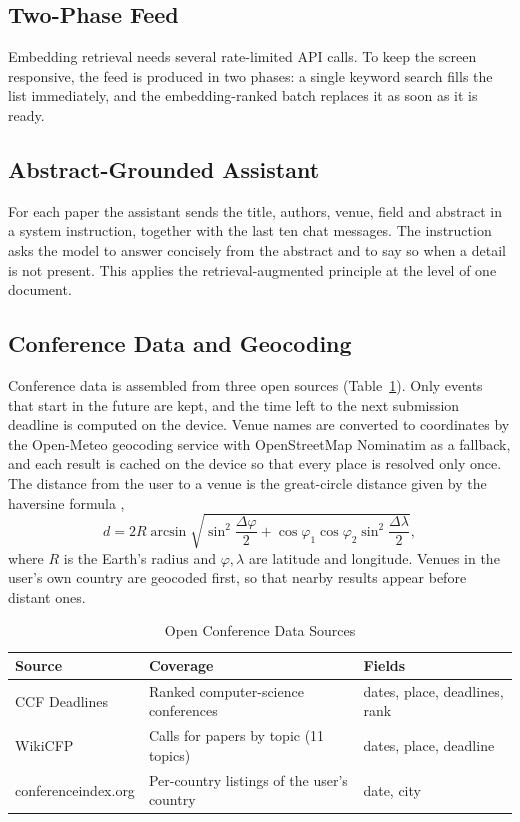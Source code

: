 \documentclass[conference]{IEEEtran}
\begin{document}
\subsection{Two-Phase Feed}
Embedding retrieval needs several rate-limited API calls. To keep the screen responsive, the feed is produced in two phases: a single keyword search fills the list immediately, and the embedding-ranked batch replaces it as soon as it is ready.

\subsection{Abstract-Grounded Assistant}
For each paper the assistant sends the title, authors, venue, field and abstract in a system instruction, together with the last ten chat messages. The instruction asks the model to answer concisely from the abstract and to say so when a detail is not present. This applies the retrieval-augmented principle \cite{lewis2020} at the level of one document.

\subsection{Conference Data and Geocoding}
Conference data is assembled from three open sources (Table~\ref{tab:sources}). Only events that start in the future are kept, and the time left to the next submission deadline is computed on the device. Venue names are converted to coordinates by the Open-Meteo geocoding service with OpenStreetMap Nominatim as a fallback, and each result is cached on the device so that every place is resolved only once. The distance from the user to a venue is the great-circle distance given by the haversine formula \cite{sinnott1984},
\begin{equation}
    d = 2R\arcsin\sqrt{\sin^2\!\frac{\Delta\varphi}{2}+\cos\varphi_1\cos\varphi_2\sin^2\!\frac{\Delta\lambda}{2}},
\end{equation}
where $R$ is the Earth's radius and $\varphi,\lambda$ are latitude and longitude. Venues in the user's own country are geocoded first, so that nearby results appear before distant ones.

\begin{table}[!t]
\caption{Open Conference Data Sources}
\label{tab:sources}
\centering
\small
\begin{tabular}{@{}p{2.4cm}p{2.9cm}p{2.1cm}@{}}
\toprule
\textbf{Source} & \textbf{Coverage} & \textbf{Fields} \\
\midrule
CCF Deadlines & Ranked computer-science conferences & dates, place, deadlines, rank \\
WikiCFP & Calls for papers by topic (11 topics) & dates, place, deadline \\
conferenceindex.org & Per-country listings of the user's country & date, city \\
\bottomrule
\end{tabular}
\end{table}
\end{document}
